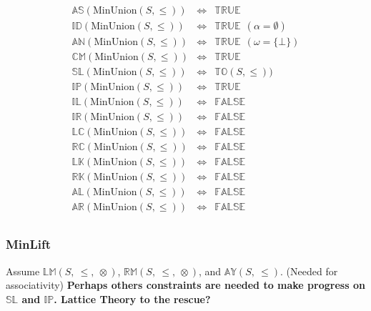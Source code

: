 \documentclass[10pt]{article}
\newcommand{\propname}[1]{{\mathbb{#1}}}
\begin{document}
\[
\begin{array}{rcl} 
\propname{AS}(\mathrm{MinUnion}(S, \leq)) 
  & \Leftrightarrow 
  & \propname{TRUE}
  \\ 
\propname{ID}(\mathrm{MinUnion}(S, \leq)) 
  & \Leftrightarrow 
  & \propname{TRUE} \ \ (\alpha = \emptyset)
  \\ 
\propname{AN}(\mathrm{MinUnion}(S, \leq)) 
  & \Leftrightarrow 
  & \propname{TRUE} \ \ (\omega = \{\bot\})
  \\
\propname{CM}(\mathrm{MinUnion}(S, \leq)) 
  & \Leftrightarrow 
  & \propname{TRUE}
  \\ 
\propname{SL}(\mathrm{MinUnion}(S, \leq)) 
  & \Leftrightarrow 
  & \propname{TO}(S, \leq))  
  \\ 
\propname{IP}(\mathrm{MinUnion}(S, \leq)) 
  & \Leftrightarrow 
  & \propname{TRUE}
  \\ 
\propname{IL}(\mathrm{MinUnion}(S, \leq)) 
  & \Leftrightarrow 
  & \propname{FALSE}
  \\ 
\propname{IR}(\mathrm{MinUnion}(S, \leq)) 
  & \Leftrightarrow 
  & \propname{FALSE}
  \\ 
\propname{LC}(\mathrm{MinUnion}(S, \leq)) 
  & \Leftrightarrow 
  & \propname{FALSE}
  \\ 
\propname{RC}(\mathrm{MinUnion}(S, \leq)) 
  & \Leftrightarrow 
  & \propname{FALSE} 
  \\ 
\propname{LK}(\mathrm{MinUnion}(S, \leq)) 
  & \Leftrightarrow 
  & \propname{FALSE} 
  \\ 
\propname{RK}(\mathrm{MinUnion}(S, \leq)) 
  & \Leftrightarrow 
  & \propname{FALSE}
  \\ 
\propname{AL}(\mathrm{MinUnion}(S, \leq))  
  & \Leftrightarrow 
  & \propname{FALSE} 
  \\ 
\propname{AR}(\mathrm{MinUnion}(S, \leq))  
  & \Leftrightarrow 
  & \propname{FALSE} 
  \\ 
\end{array} 
\] 

\subsubsection{MinLift} 

Assume 
$\propname{LM}(S,\ \leq,\ \otimes)$, 
$\propname{RM}(S,\ \leq,\ \otimes)$, 
and 
$\propname{AY}(S,\ \leq)$. 
(Needed for associativity) 
{\bf Perhaps others constraints are needed to make progress on 
$\propname{SL}$ and $\propname{IP}$. 
Lattice Theory to the rescue?
}
\end{document}
